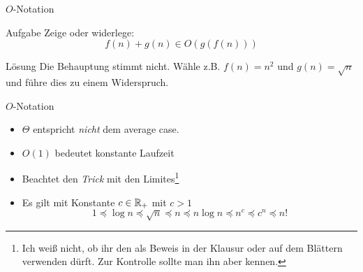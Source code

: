 \begin{frame}{$O$-Notation}
    \begin{exampleblock}{Aufgabe}
    	Zeige oder widerlege:
    	\[
    		f(n) + g(n) \in O(g(f(n)))
    	\]
    \end{exampleblock}
\pause
	\begin{block}{Lösung}
		Die Behauptung stimmt nicht. Wähle z.B. $f(n) = n^2$ und $g(n) = \sqrt{n}$ und führe dies zu einem Widerspruch.
	\end{block}
\end{frame}

\begin{frame}{$O$-Notation} %
    \begin{itemize}
    	\item $\Theta$ entspricht \emph{nicht} dem average case.
    	\item $O(1)$ bedeutet konstante Laufzeit
    	\item Beachtet den \emph{Trick} mit den Limites\footnote{Ich weiß nicht, ob ihr den als Beweis in der Klausur oder auf dem Blättern verwenden dürft. Zur Kontrolle sollte man ihn aber kennen.}
        \item Es gilt mit Konstante $c \in \mathbb{R}_+$ mit $c>1$
        \[
            1 \preceq \log n \preceq \sqrt{n} \preceq n \preceq n \log n \preceq n^c \preceq c^n \preceq n!
        \]
    \end{itemize}
\end{frame}

